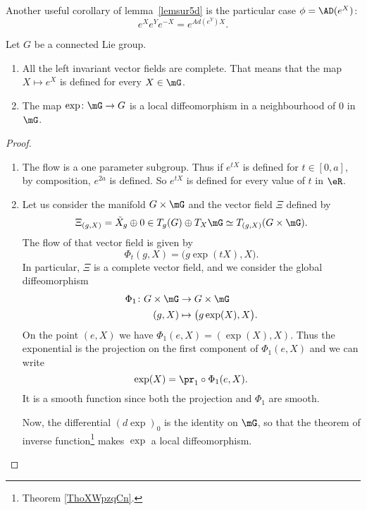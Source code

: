 \begin{corollary}
Another useful corollary of lemma~\ref{lemsur5d} is the particular case $\phi=\AD(e^X)$:
\[
   e^Xe^Ye^{-X}=e^{Ad(e^Y)X}.
\]
\label{cor:eXeYe-X}
\end{corollary}

\begin{proposition}
	Let $G$ be a connected Lie group.
	\begin{enumerate}

		\item
			All the left invariant vector fields are complete. That means that the map $X\mapsto  e^{X}$ is defined for every $X\in \mG$.
		\item
			The map $\exp\colon \mG\to G$ is a local diffeomorphism in a neighbourhood of $0$ in $\mG$.
	\end{enumerate}
\end{proposition}

\begin{proof}
	\begin{enumerate}

		\item
			The flow is a one parameter subgroup. Thus if $ e^{tX}$ is defined for $t\in[0,a]$, by composition, $ e^{2a}$ is defined. So $ e^{tX}$ is defined for every value of $t$ in $\eR$.
		\item
			Let us consider the manifold $G\times \mG$ and the vector field $\Xi$ defined by
			\begin{equation}
				\Xi_{(g,X)}=\tilde X_g\oplus 0\in T_g(G)\oplus T_X\mG\simeq T_{(g,X)}(G\times \mG).
			\end{equation}
			The flow of that vector field is given by
			\begin{equation}
				\Phi_t(g,X)=\big( g\exp(tX),X \big).
			\end{equation}
			In particular, $\Xi$ is a complete vector field, and we consider the global diffeomorphism
			\begin{equation}
				\begin{aligned}
					\Phi_1\colon G\times \mG&\to G\times \mG \\
					(g,X)&\mapsto \big( g\exp(X),X \big).
				\end{aligned}
			\end{equation}
			On the point $(e,X)$ we have $\Phi_1(e,X)=(\exp(X),X)$. Thus the exponential is the projection on the first component of $\Phi_1(e,X)$ and we can write
			\begin{equation}
				\exp(X)=\pr_1\circ\Phi_1(e,X).
			\end{equation}
			It is a smooth function since both the projection and $\Phi_1$ are smooth.

            Now, the differential $(d\exp)_0$ is the identity on $\mG$, so that the theorem of inverse function\footnote{Theorem \ref{ThoXWpzqCn}.} makes $\exp$ a local diffeomorphism.
	\end{enumerate}
\end{proof}


